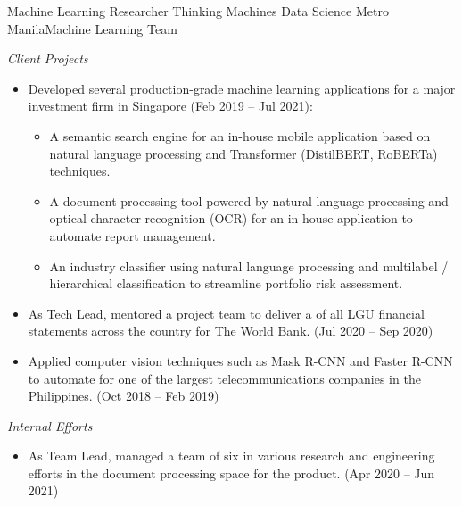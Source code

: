 \documentclass[12pt,a4paper]{moderncv}
\begin{document}
{Machine Learning Researcher}
{Thinking Machines Data Science}
{Metro Manila}{Machine Learning Team}
{
    \vspace{3px}
    \textit{Client Projects}
    \begin{itemize}
        \item Developed several production-grade machine learning applications
            for a major investment firm in Singapore (Feb 2019 -- Jul 2021): 
            \begin{itemize}
                \item A semantic search engine for an in-house mobile
                    application based on natural language processing and
                    Transformer (DistilBERT, RoBERTa) techniques. 
                \item A document processing tool powered by natural language
                    processing and optical character recognition (OCR) for an
                    in-house application to automate report management.
                \item An industry classifier using natural language processing
                    and multilabel / hierarchical classification to
                    streamline portfolio risk assessment. 
            \end{itemize}
        \item As Tech Lead, mentored a project team to deliver a {\color{blue}
            } of all LGU financial statements across the
            country for The World Bank.  (Jul 2020 -- Sep 2020)
        \item Applied computer vision techniques such as Mask R-CNN and Faster
        R-CNN to automate {\color{blue}}
        for one of the largest telecommunications companies in the Philippines.
        (Oct 2018 -- Feb 2019)
    \end{itemize}
    \vspace{3px}
    \textit{Internal Efforts}
    \begin{itemize}
        \item As Team Lead, managed a team of six in various research and
            engineering efforts in the document processing space for the
            {\color{blue}}
            product. (Apr 2020 -- Jun 2021)
    \end{itemize}
}
\end{document}
